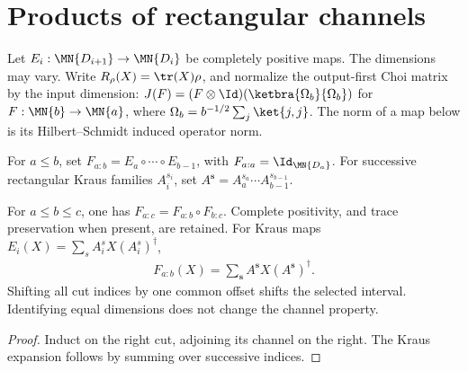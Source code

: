 \section{Products of rectangular channels}
\label{sec:rectangular_windows}

Let $E_i:\MN{D_{i+1}}\to\MN{D_i}$ be completely positive maps.
The dimensions may vary. Write $R_\rho(X)=\tr(X)\rho$, and normalize
the output-first Choi matrix by the input dimension:
$J(F)=(F\otimes\Id)(\ketbra{\Omega_b}{\Omega_b})$ for
$F:\MN{b}\to\MN{a}$, where $\Omega_b=b^{-1/2}\sum_j\ket{j,j}$.
The norm of a map below is its Hilbert--Schmidt induced operator norm.

\begin{definition}
    \label{def:rectangular_channel_interval}
    \leanok
    For $a\le b$, set $F_{a:b}=E_a\circ\cdots\circ E_{b-1}$,
    with $F_{a:a}=\Id_{\MN{D_a}}$.
    For successive rectangular Kraus families $A_i^{s_i}$, set
    $A^{\boldsymbol s}=A_a^{s_a}\cdots A_{b-1}^{s_{b-1}}$.
\end{definition}

\begin{theorem}
    \label{thm:rectangular_channel_composition}
    \leanok
    For $a\le b\le c$, one has $F_{a:c}=F_{a:b}\circ F_{b:c}$.
    Complete positivity, and trace preservation when present, are retained.
    For Kraus maps $E_i(X)=\sum_s A_i^sX(A_i^s)^\dagger$,
    \begin{align}
        F_{a:b}(X)=\sum_{\boldsymbol s}A^{\boldsymbol s}X(A^{\boldsymbol s})^\dagger.
    \end{align}
    Shifting all cut indices by one common offset shifts the selected interval.
    Identifying equal dimensions does not change the channel property.
\end{theorem}
\begin{proof}\leanok
    Induct on the right cut, adjoining its channel on the right.
    The Kraus expansion follows by summing over successive indices.
\end{proof}

